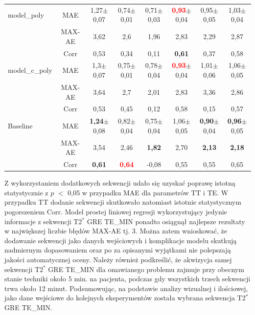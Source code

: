 \begin{table}[h!]
\begin{center}
\begin{tabular}{lc||c|c|c|c|c|c}
			\hline
			model\_poly&MAE & 1,27$\pm$ 0,07 & 0,74$\pm$0,01 & 0,71$\pm$0,03 & \textcolor{red}{\textbf{0,93}}$\pm$0,04 & 0,95$\pm$0,05 & 1,03$\pm$0,04\\
			&MAX-AE &3,62&2,6&1,96&2,83&2,29&2,87\\
			&Corr &0,53&0,34&0,11&\textbf{0,61}&0,37&0,58\\
			
			\hline
			model\_c\_poly&MAE & 1,3$\pm$0,07 & 0,75$\pm$0,01 & 0,78$\pm$0,04 & \textcolor{red}{\textbf{0,93}}$\pm$0,04 & 1,01$\pm$0,06 & 1,06$\pm$0,05 \\
			&MAX-AE &3,64&2,7&2,01&2,83&3,36&2,86\\
			&Corr &0,53&0,45&0,12&0,58&0,15&0,57\\
			\hline 
			
			Baseline& MAE & \textbf{1,24}$\pm$0,08 & 0,82$\pm$0,04 & 0,75$\pm$0,04 & 1,06$\pm$0,05 & \textbf{0,90}$\pm$0,04 & \textbf{0,96}$\pm$0,05 \\
			&MAX-AE & 3,54 & 2,46 & \textbf{1,82} & 2,70 & \textbf{2,13} & \textbf{2,18}\\
			&Corr   & \textbf{0,61} & \textcolor{red}{\textbf{0,64}} &-0,08 & 0,55 & 0,55 & 0,65\\
			\hline
		\end{tabular}
	\end{center}
	\label{tab:H_testset}
\end{table}
\renewcommand{\arraystretch}{1}

Z wykorzystaniem dodatkowych sekwencji udało się uzyskać poprawę istotną statystycznie z $p$ $<$ 0,05 w przypadku MAE dla parametrów TT i TE. W przypadku TT dodanie sekwencji skutkowało natomiast istotnie statystycznym pogorszeniem Corr. Model prostej liniowej regresji wykorzystujący jedynie informacje z sekwencji T2$^\ast$ GRE TE\_MIN ponadto osiągnął najlepsze rezultaty w największej liczbie błędów MAX-AE tj. 3. Można zatem wnioskować, że dodawanie sekwencji jako danych wejściowych i komplikacje modelu skutkują nadmiernym dopasowaniem oraz po za opisanymi wyjątkami nie polepszają jakości automatycznej oceny. Należy również podkreślić, że akwizycja samej sekwencji T2$^\ast$ GRE TE\_MIN dla omawianego problemu zajmuje przy obecnym stanie techniki około 5 min. na pacjenta, podczas gdy wszystkich trzech sekwencji trwa około 12 minut. Podsumowując, na podstawie analizy wizualnej i ilościowej, jako dane wejściowe do kolejnych eksperymentów została wybrana sekwencja T2$^\ast$ GRE TE\_MIN. 

